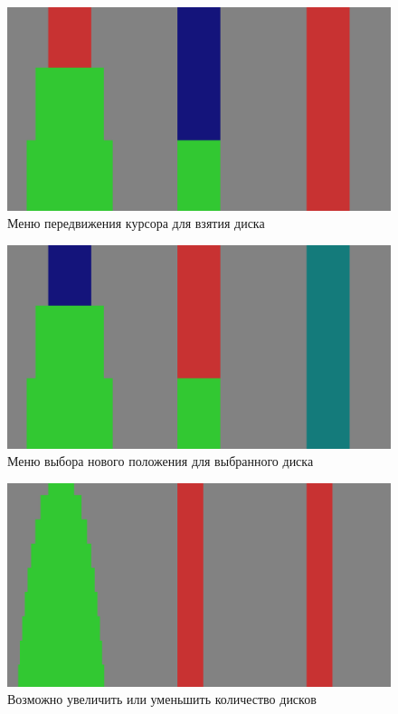 \begin{figure}[H]
	\begin{center}
		\includegraphics[width=\textwidth]{images/move_mode.png}
		\caption{Меню передвижения курсора для взятия диска}
	\end{center}
\end{figure}
\begin{figure}[H]
	\begin{center}
		\includegraphics[width=\textwidth]{images/select_mode.png}
		\caption{Меню выбора нового положения для выбранного диска}
	\end{center}
\end{figure}
\begin{figure}[H]
	\begin{center}
		\includegraphics[width=\textwidth]{images/many_disks.png}
		\caption{Возможно увеличить или уменьшить количество дисков}
	\end{center}
\end{figure}
